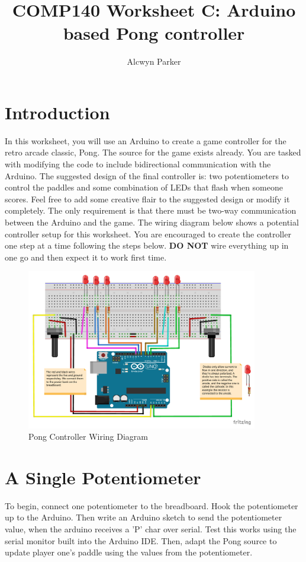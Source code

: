 \documentclass{../../../fal_assignment}
\title{COMP140 Worksheet C: Arduino based Pong controller}
\author{Alcwyn Parker}
\begin{document}
\maketitle



\section*{Introduction}

In this worksheet, you will use an Arduino to create a game controller for the retro arcade classic, Pong. The source for the game exists already. You are tasked with modifying the code to include bidirectional communication with the Arduino. The suggested design of the final controller is: two potentiometers to control the paddles and some combination of LEDs that flash when someone scores. Feel free to add some creative flair to the suggested design or modify it completely. The only requirement is that there must be two-way communication between the Arduino and the game. The wiring diagram below shows a potential controller setup for this worksheet. You are encouraged to create the controller one step at a time following the steps below. \textbf{DO NOT} wire everything up in one go and then expect it to work first time. 

\begin{figure}[!h]
	\begin{center}
		\includegraphics[width=0.9\textwidth]{assets/arduino-pong.pdf}
	\end{center}
	\caption{Pong Controller Wiring Diagram}
	\label{fig:wiring}
\end{figure}

\section{A Single Potentiometer} \label{arduino-first}
To begin, connect one potentiometer to the breadboard. Hook the potentiometer up to the Arduino. Then write an Arduino sketch to send the potentiometer value, when the arduino receives a 'P' char over serial. Test this works using the serial monitor built into the Arduino IDE. Then, adapt the Pong source to update player one's paddle using the values from the potentiometer. 
\end{document}

